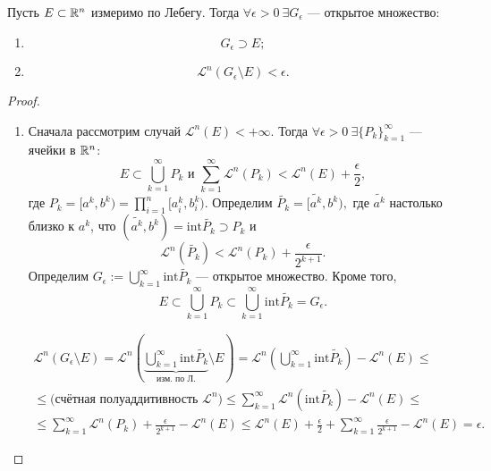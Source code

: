 \begin{theorem}[1]
    Пусть $E \subset \mathbb{R}^n$ измеримо по Лебегу.
    Тогда $\forall \epsilon > 0 \ \exists G_{\epsilon}$ — открытое множество:
    \begin{enumerate}
        \item $$G_{\epsilon} \supset E;$$
        \item $$\mathcal{L}^n (G_\epsilon \setminus E) < \epsilon.$$
    \end{enumerate}
\end{theorem} 
\begin{proof}\tab
\begin{enumerate}
    \item Сначала рассмотрим случай $\mathcal{L}^n(E) < + \infty$.
    Тогда $\forall \epsilon > 0 \ \exists \{P_k\}_{k=1}^{\infty}$ — ячейки в $\mathbb{R}^n$:
    \[E \subset  \bigcup\limits_{k=1}^{\infty} P_k \text{ и } \sum\limits_{k=1}^{\infty} \mathcal{L}^n (P_k) < \mathcal{L}^n(E) + \frac{\epsilon}{2},\]
    где $P_k = [a^k, b^k) = \prod\limits_{i=1}^{n} [a_i^k, b_i^k).$
    Определим $\widetilde{P_k} = [\widetilde{a^k}, b^k),$
    где $\widetilde{a^k}$ настолько близко к $a^k$, что $(\widetilde{a^k}, b^k) = \text{int} \widetilde{P_k} \supset P_k$
    и
    \[\mathcal{L}^n(\widetilde{P_k}) < \mathcal{L}^n(P_k) + \frac{\epsilon}{2^{k+1}}.\]
    Определим $G_\epsilon := \bigcup\limits_{k=1}^{\infty} \text{int} \widetilde{P_k}$ — открытое множество.
    Кроме того,
    \[E \subset \bigcup\limits_{k=1}^{\infty} P_k \subset \bigcup\limits_{k=1}^{\infty} \text{int} \widetilde{P_k} = G_\epsilon.\]
    
    \begin{multline*}
        \mathcal{L}^n (G_\epsilon \setminus E) = \mathcal{L}^n \left(\underbrace{\bigcup\limits_{k=1}^{\infty} \text{int} \widetilde{P_k}}_{\text{изм. по Л.}} \setminus E\right) = \mathcal{L}^n \left(\bigcup\limits_{k=1}^{\infty} \text{int} \widetilde{P_k}\right) - \mathcal{L}^n (E) 
        \leqslant\\\leqslant \text{(счётная полуаддитивность $\mathcal{L}^n$)} \leqslant \sum\limits_{k=1}^{\infty} \mathcal{L}^n(\text{int} \widetilde{P_k}) - \mathcal{L}^n(E)
        \leqslant\\\leqslant
        \sum\limits_{k=1}^{\infty} \mathcal{L}^n(P_k) + \frac{\epsilon}{2^{k+1}} - \mathcal{L}^n(E) 
        \leqslant \mathcal{L}^n(E) + \frac{\epsilon}{2} + \sum\limits_{k=1}^{\infty} \frac{\epsilon}{2^{k+1}} - \mathcal{L}^n(E) = \epsilon.
    \end{multline*}


\end{enumerate}
\end{proof}
